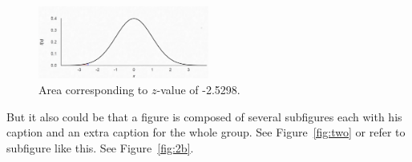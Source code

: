 \begin{enumerate}
 
\begin{figure}[htb]
  \centering
  \label{fig:one}
  \includegraphics[width=0.5\textwidth]{img/normal}
  \caption{Area corresponding to $z$-value of -2.5298.}
\end{figure}

But it also could be that a figure is composed of several subfigures each with his caption and an extra caption for the whole group. See Figure~\ref{fig:two} or refer to subfigure like this. See Figure~\ref{fig:2b}.


\end{enumerate}

